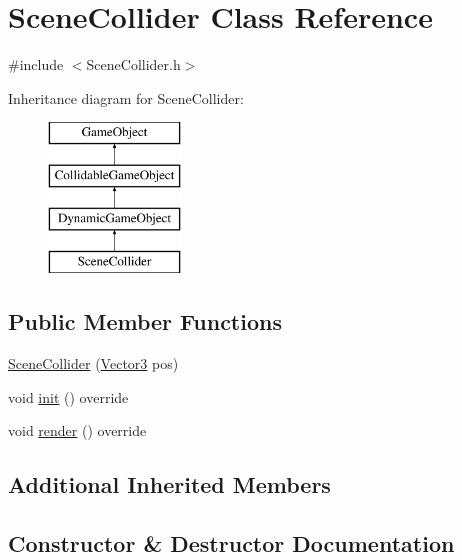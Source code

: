 \hypertarget{class_scene_collider}{}\section{Scene\+Collider Class Reference}
\label{class_scene_collider}


{\ttfamily \#include $<$Scene\+Collider.\+h$>$}

Inheritance diagram for Scene\+Collider\+:\begin{figure}[H]
\begin{center}
\leavevmode
\includegraphics[height=4.000000cm]{class_scene_collider}
\end{center}
\end{figure}
\subsection*{Public Member Functions}
\begin{DoxyCompactItemize}
\item 
\hyperlink{class_scene_collider_a1694cf0e8d99751e9636fe98ebc81e61}{Scene\+Collider} (\hyperlink{class_vector3}{Vector3} pos)
\item 
void \hyperlink{class_scene_collider_a2b2aae1d24b6f40188150d3002e00218}{init} () override
\item 
void \hyperlink{class_scene_collider_aa46bbfb6657449115aa6855a8f46e3f5}{render} () override
\end{DoxyCompactItemize}
\subsection*{Additional Inherited Members}


\subsection{Constructor \& Destructor Documentation}
\mbox{\label{class_scene_collider_a1694cf0e8d99751e9636fe98ebc81e61}} 
